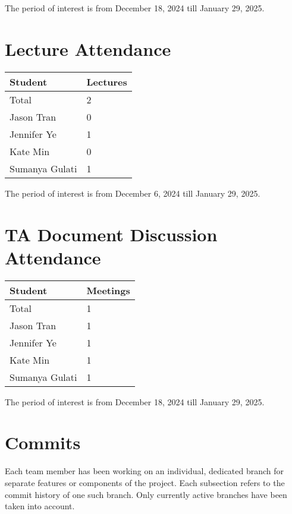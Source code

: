 \documentclass{article}
\begin{document}
The period of interest is from December 18, 2024 till January 29, 2025.

\section{Lecture Attendance}

\begin{table}[H]
\centering
\begin{tabular}{ll}
\toprule
\textbf{Student} & \textbf{Lectures}\\
\midrule
Total & 2\\
Jason Tran & 0\\
Jennifer Ye & 1\\
Kate Min & 0\\
Sumanya Gulati & 1\\
\bottomrule
\end{tabular}
\end{table}

The period of interest is from December 6, 2024 till January 29, 2025.

\section{TA Document Discussion Attendance}

\begin{table}[H]
\centering
\begin{tabular}{ll}
\toprule
\textbf{Student} & \textbf{Meetings}\\
\midrule
Total & 1\\
Jason Tran & 1\\
Jennifer Ye & 1\\
Kate Min & 1\\
Sumanya Gulati & 1\\
\bottomrule
\end{tabular}
\end{table}

The period of interest is from December 18, 2024 till January 29, 2025.

\section{Commits}
Each team member has been working on an individual, dedicated branch for separate features or 
components of the project. Each subsection refers to the commit history of one such branch.
Only currently active branches have been taken into account. 
\end{document}
